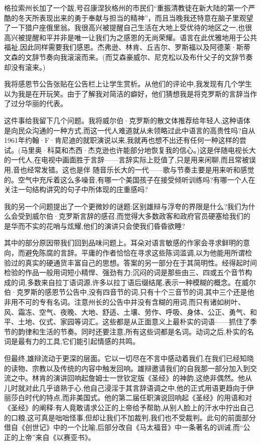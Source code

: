 格拉索州长加了一个跋,号召康涅狄格州的市民们“重振清教徒在新大陆的第一个严酷的冬天所表现出来的勇于奉献与担当的精神”，而且当晚我还特意在脑子里观望了一下猎户座俄里翁。我很高兴被提醒自己生活在大地上受优待的地区之一,也很高兴被提醒和平并非是唯一让我们为之感恩的无尚荣耀。语言在此优雅地用于公共福祉,因此同样需要我们感恩。杰弗逊、林肯、丘吉尔、罗斯福以及阿德莱·斯蒂文森的文辞节奏向我滚滚而来。(而艾森豪威尔、尼克松以及布什父子的文辞节奏却没有滚来。)

我将感恩节公告张贴在公告栏上让学生赏析。从他们的评论中,我发现有几个学生以为我是在开玩笑。由于了解我对简洁的癖好，他们猜想我是将克罗斯的言辞当作了过分华丽的代表。

这件事给我留下几个问题。我将威尔伯·克罗斯的散文体推荐给年轻人,这种语体是向民众沟通的一种方式,而这一代人难道就从未领略过此中语言的高贵性吗?自从1961年约翰·F·肯尼迪的就职演说以来,我就再也想不出还有任何一种这样的尝试。(马里奥·科莫和杰西·杰克逊也许能部分地恢复我的信心。)这是伴随电视长大的一代人,在电视中画面胜于言辞——言辞实际上贬值了,只是用来闲聊,而且常被误用,音也经常发错。这也是伴 随音乐长大的一代——歌与节奏主要是用来听和感觉的。空气中充斥着这么多噪音,有哪一个美国孩子在接受倾听训练吗?有哪一个人在关注一句结构讲究的句子中所体现的庄重感吗?

我的另一个问题提出了一个更微妙的谜题:区别雄辩与浮夸的界限是什么?我们为什么会受到威尔伯·克罗斯言辞的感召,而觉得大多数政客和政府官员硬塞给我们的是华而不实的花哨与炫耀,他们的演讲只会使我们昏昏欲睡?

其中的部分原因带我们回到品味问题上。耳朵对语言敏感的作家会寻求鲜明的意向，而避免陈腐的言辞。平庸的作者恰恰在寻求这些陈词滥调,以为他能用所谓检验过的真实的硬通货丰富自己的思想。答案的另一部分在于其简明性。经得起时间检验的作品一般用词短小精悍、强劲有力;沉闷的词是那些由三、四或五个音节构成的词,多数来自拉丁语词源,许多以拉丁语后缀结尾,表示一种模糊的概念。在威尔伯·克罗斯的感恩节公告中,没有四音节的词,只有十个三音节的词,其中三个还是他非用不可的专有名词。注意州长的公告中并没有含糊的用词,而只有诸如树叶、风、霜冻、空气、夜晚、大地、舒适、土壤、劳作、呼吸、身体、公正、勇气、和平、土地、仪式、家园等词汇。这些都是从正面意义上最朴实的词语——抓住了季节的韵律和生活的节奏。同时还要注意,所有这些词都是名词。动词之后,朴实的名词是最有力的工具,它们能引起情感的共鸣。

但最终,雄辩流动于更深的层面。它以一切尽在不言中感动着我们,在我们已经知晓的读物、宗教以及传统的内容中触发回响。雄辩邀请我们的自我那一部分加入到交流之中。林肯的演讲回响起詹姆士一世钦定版《圣经》的神韵,这绝非偶然。他从儿时就对此几乎谙熟于心,他自己浸淫于其言辞语调之中,他的正式用语更趋向于伊丽莎白时代的特点,而非美国式。他的第二届任职演说回响起《圣经》的用语和对《圣经》的阐释:有人竟敢请求公正的上帝给予帮助,从别人脸上的汗水中拧出自己的口粮,这可真是咄咄怪事,但却让我们不加裁判,我们也不受裁判。此句的前面部分借自《创世记》中的一个比喻,后部分改自《马太福音》中一条著名的训诫,而“公正的上帝”来自《以赛亚书》。

